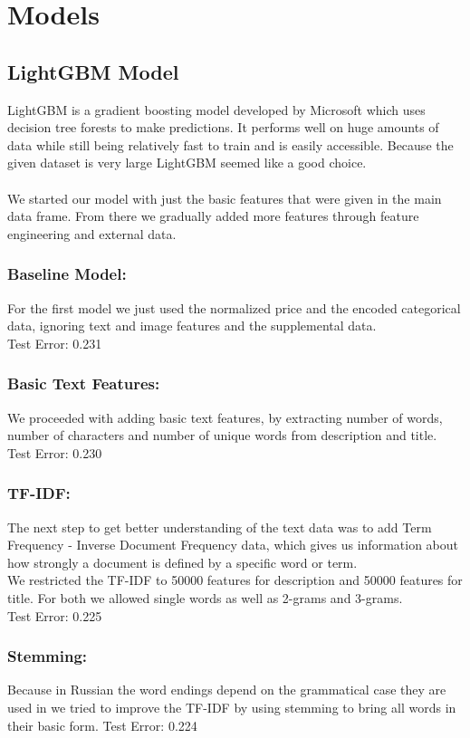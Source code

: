 \documentclass[runningheads]{llncs}
\begin{document}
\section{Models}
\subsection{LightGBM Model}
LightGBM is a gradient boosting model developed by Microsoft which uses decision tree forests to make predictions. It performs well on huge amounts of data while still being relatively fast to train and is easily accessible. Because the given dataset is very large LightGBM seemed like a good choice. \\\\
We started our model with just the basic features that were given in the main data frame. From there we gradually added more features through feature engineering and external data.
\subsubsection{Baseline Model:} For the first model we just used the normalized price and the encoded categorical data, ignoring text and image features and the supplemental data. \\
Test Error: 0.231
\subsubsection{Basic Text Features:} We proceeded with adding basic text features, by extracting number of words, number of characters and number of unique words from description and title. \\
Test Error: 0.230
\subsubsection{TF-IDF:} The next step to get better understanding of the text data was to add Term Frequency - Inverse Document Frequency data, which gives us information about how strongly a document is defined by a specific word or term.\\
We restricted the TF-IDF to 50000 features for description and 50000 features for title. For both we allowed single words as well as 2-grams and 3-grams.\\
Test Error: 0.225\\
\subsubsection{Stemming:} Because in Russian the word endings depend on the grammatical case they are used in we tried to improve the TF-IDF by using stemming to bring all words in their basic form.
Test Error: 0.224
\end{document}
